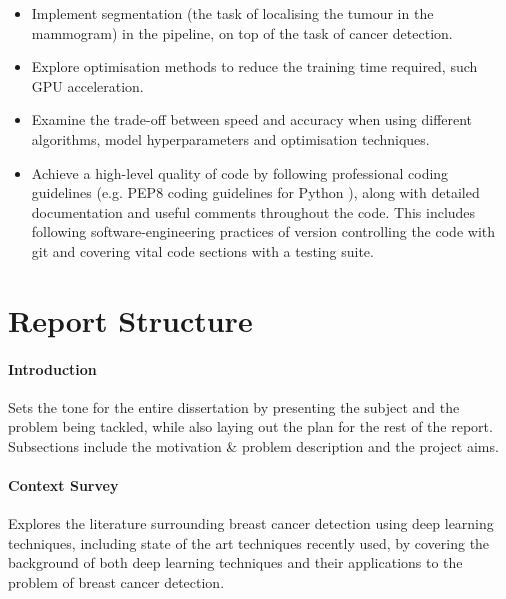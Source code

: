 \begin{itemize}
    \item Implement segmentation (the task of localising the tumour in the mammogram) in the pipeline, on top of the task of cancer detection.
    \item Explore optimisation methods to reduce the training time required, such  GPU acceleration.
    \item Examine the trade-off between speed and accuracy when using different algorithms, model hyperparameters and optimisation techniques.
    \item Achieve a high-level quality of code by following professional coding guidelines (e.g. PEP8 coding guidelines for Python \cite{pep8}), along with detailed documentation and useful comments throughout the code. This includes following software-engineering practices of version controlling the code with git and covering vital code sections with a testing suite.
\end{itemize}


\section{Report Structure}

\paragraph{Introduction}
Sets the tone for the entire dissertation by presenting the subject and the problem being tackled, while also laying out the plan for the rest of the report. Subsections include the motivation \& problem description and the project aims.

\paragraph{Context Survey}
Explores the literature surrounding breast cancer detection using deep learning techniques, including state of the art techniques recently used, by covering the background of both deep learning techniques and their applications to the problem of breast cancer detection.

